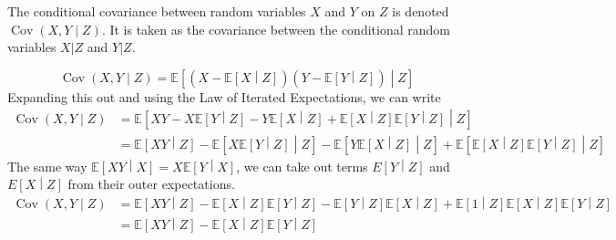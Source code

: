 \documentclass[11pt]{report} %
\begin{document}
The conditional covariance between random variables $X$ and $Y$ on $Z$ is denoted $\operatorname{Cov}\left(X, Y\middle| Z\right)$. It is taken as the covariance between the conditional random variables $X|Z$ and $Y|Z$.

\begin{equation}
\operatorname{Cov}\left(X, Y\middle| Z\right) = \mathbb{E}\left[\left(X - \mathbb{E}\left[X\middle| Z\right]\right)\left(Y - \mathbb{E}\left[Y\middle| Z\right]\right)\middle|Z\right]
\end{equation}
Expanding this out and using the Law of Iterated Expectations, we can write
\begin{align}
\operatorname{Cov}\left(X, Y\middle| Z\right) &= \mathbb{E}\left[XY - X\mathbb{E}\left[Y\middle|Z\right] - Y\mathbb{E}\left[X\middle|Z\right] + \mathbb{E}\left[X\middle| Z\right]\mathbb{E}\left[Y\middle| Z\right]\middle|Z\right] \\
&= \mathbb{E}\left[XY\middle|Z\right] - \mathbb{E}\left[X\mathbb{E}\left[Y\middle|Z\right]\middle|Z\right] - \mathbb{E}\left[Y\mathbb{E}\left[X\middle|Z\right]\middle|Z\right] +\mathbb{E}\left[\mathbb{E}\left[X\middle| Z\right]\mathbb{E}\left[Y\middle| Z\right]\middle|Z\right]
\end{align}
The same way $\mathbb{E}\left[XY\middle|X\right] = X\mathbb{E}\left[Y\middle|X\right]$, we can take out terms ${E}\left[Y\middle|Z\right]$ and ${E}\left[X\middle|Z\right]$ from their outer expectations.
\begin{align}
\operatorname{Cov}\left(X, Y\middle| Z\right) &= \mathbb{E}\left[XY\middle|Z\right] - \mathbb{E}\left[X\middle|Z\right]\mathbb{E}\left[Y\middle|Z\right] - \mathbb{E}\left[Y\middle|Z\right]\mathbb{E}\left[X\middle|Z\right] +\mathbb{E}\left[1\middle|Z\right]\mathbb{E}\left[X\middle| Z\right]\mathbb{E}\left[Y\middle| Z\right] \\
 &= \mathbb{E}\left[XY\middle|Z\right] - \mathbb{E}\left[X\middle|Z\right]\mathbb{E}\left[Y\middle|Z\right]
\end{align}
\end{document}
